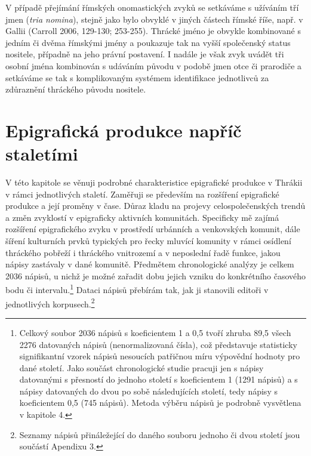V případě přejímání římských onomastických zvyků se setkáváme s užíváním tří jmen ({\em tria nomina}), stejně jako bylo obvyklé v jiných částech římské říše, např. v Gallii (Carroll 2006, 129-130; 253-255). Thrácké jméno je obvykle kombinované s jedním či dvěma římskými jmény a poukazuje tak na vyšší společenský status nositele, případně na jeho právní postavení. I nadále je však zvyk uvádět tři osobní jména kombinován s udáváním původu v podobě jmen otce či prarodiče a setkáváme se tak s komplikovaným systémem identifikace jednotlivců za zdůraznění thráckého původu nositele.

\chapter{Epigrafická produkce napříč staletími}
V této kapitole se věnuji podrobné charakteristice epigrafické produkce v Thrákii v rámci jednotlivých staletí. Zaměřuji se především na rozšíření epigrafické produkce a její proměny v čase. Důraz kladu na projevy celospolečenských trendů a změn zvyklostí v epigraficky aktivních komunitách. Specificky mě zajímá rozšíření epigrafického zvyku v prostředí urbánních a venkovských komunit, dále šíření kulturních prvků typických pro řecky mluvící komunity v rámci osídlení thráckého pobřeží i thráckého vnitrozemí a v neposlední řadě funkce, jakou nápisy zastávaly v dané komunitě. Předmětem chronologické analýzy je celkem 2036 nápisů, u nichž je možné zařadit dobu jejich vzniku do konkrétního časového bodu či intervalu.\footnote{Celkový soubor 2036 nápisů s koeficientem 1 a 0,5 tvoří zhruba 89,5  všech 2276 datovaných nápisů (nenormalizovaná čísla), což představuje statisticky signifikantní vzorek nápisů nesoucích patřičnou míru výpovědní hodnoty pro dané století. Jako součást chronologické studie pracuji jen s nápisy datovanými s přesností do jednoho století s koeficientem 1 (1291 nápisů) a s nápisy datovaných do dvou po sobě následujících století, tedy nápisy s koeficientem 0,5 (745 nápisů). Metoda výběru nápisů je podrobně vysvětlena v kapitole 4.} Dataci nápisů přebírám tak, jak ji stanovili editoři v jednotlivých korpusech.\footnote{Seznamy nápisů přináležející do daného souboru jednoho či dvou století jsou součástí Apendixu 3.}

